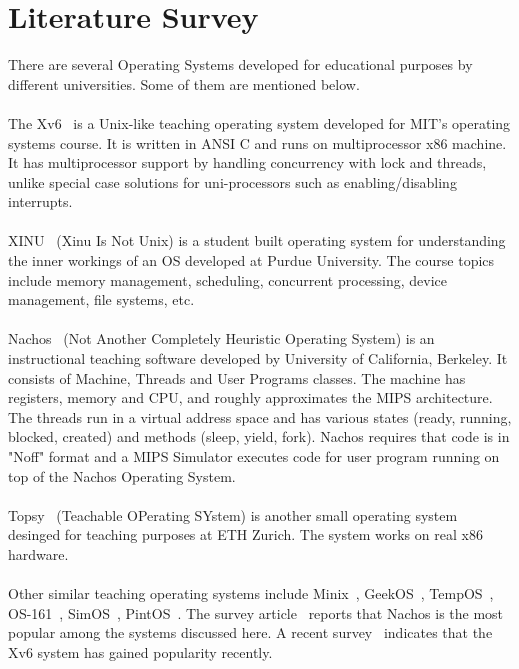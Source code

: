 \documentclass[12pt]{report}
\begin{document}
\section{Literature Survey}
There are several Operating Systems developed for educational purposes by different universities. Some of them are mentioned below.

\paragraph{}
The Xv6~\cite{ref-xv6} is a Unix-like teaching operating system developed for MIT's operating systems course. It is written in ANSI C and runs on multiprocessor x86 machine. It has multiprocessor support by handling concurrency with lock and threads, unlike special case solutions for uni-processors such as enabling/disabling interrupts.

\paragraph{}
XINU~\cite{ref-xinu} (Xinu Is Not Unix) is a student built operating system for understanding the inner workings of an OS developed at Purdue University. The course topics include memory management, scheduling, concurrent processing, device management, file systems, etc.

\paragraph{}
Nachos~\cite{ref-nachos} (Not Another Completely Heuristic Operating System) is an instructional teaching software developed by University of California, Berkeley. It consists of Machine, Threads and User Programs classes. The machine has registers, memory and CPU, and roughly approximates the MIPS architecture. The threads run in a virtual address space and has various states (ready, running, blocked, created) and methods (sleep, yield, fork). Nachos requires that code is in "Noff" format and a MIPS Simulator executes code for user program running on top of the Nachos Operating System.

\paragraph{}
Topsy~\cite{ref-topsy} (Teachable OPerating SYstem) is another small operating system desinged for teaching purposes at ETH Zurich. The system works on real x86 hardware.  

\paragraph{}
Other similar teaching operating systems include Minix~\cite{ref-minix}, GeekOS~\cite{ref-geekos}, TempOS~\cite{ref-tempos}, OS-161~\cite{ref-os161}, SimOS~\cite{ref-simos}, PintOS~\cite{ref-pintos}. The survey article~\cite{ref-survey1} reports that Nachos is the most popular among the systems discussed here. A recent survey~\cite{ref-survey2} indicates that the Xv6 system has gained popularity recently.
\end{document}
